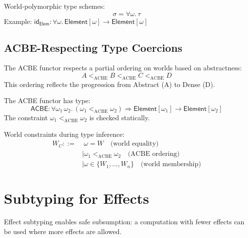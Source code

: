 \begin{definition}
\label{def:world-poly}
World-polymorphic type schemes:
\[
\sigma = \forall \omega.\, \tau
\]
Example: $\mathsf{id}_{\mathsf{Elem}} : \forall \omega.\, \mathsf{Element}[\omega] \to \mathsf{Element}[\omega]$
\end{definition}

\subsection{ACBE-Respecting Type Coercions}
\label{subsec:acbe-coercions}

\begin{definition}
\label{def:world-ordering}
The ACBE functor respects a partial ordering on worlds based on abstractness:
\[
A <_{\mathrm{ACBE}} B <_{\mathrm{ACBE}} C <_{\mathrm{ACBE}} D
\]
This ordering reflects the progression from Abstract (A) to Dense (D).
\end{definition}

\begin{definition}
\label{def:acbe-coercion-type}
The ACBE functor has type:
\[
\mathsf{ACBE} : \forall \omega_1\, \omega_2.\, (\omega_1 <_{\mathrm{ACBE}} \omega_2) \Rightarrow \mathsf{Element}[\omega_1] \to \mathsf{Element}[\omega_2]
\]
The constraint $\omega_1 <_{\mathrm{ACBE}} \omega_2$ is checked statically.
\end{definition}

\begin{definition}
\label{def:world-constraints}
World constraints during type inference:
\begin{align}
W_C ::=&\; \omega = W \quad \text{(world equality)} \\
    &\mid \omega_1 <_{\mathrm{ACBE}} \omega_2 \quad \text{(ACBE ordering)} \\
    &\mid \omega \in \{W_1, \ldots, W_n\} \quad \text{(world membership)}
\end{align}
\end{definition}

\section{Subtyping for Effects}
\label{sec:effect-subtyping}

Effect subtyping enables safe subsumption: a computation with fewer effects can be used where more effects are allowed.

